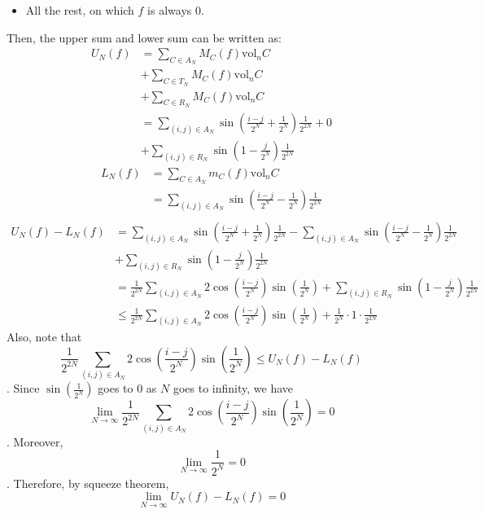 \documentclass{homework}
\begin{document}
\begin{problem}{1}
\begin{itemize}
\item All the rest, on which $f$ is always $0$.
\end{itemize}
Then, the upper sum and lower sum can be written as:
\begin{align*}
U_N(f) &= \sum_{C \in A_N} M_C(f) \mathrm{vol}_n C \\
       &+ \sum_{C \in T_N} M_C(f) \mathrm{vol}_n C \\
       &+ \sum_{C \in R_N} M_C(f) \mathrm{vol}_n C \\
       &= \sum_{(i, j) \in A_N}
          \sin(\frac{i - j}{2^N} + \frac{1}{2^N}) \frac{1}{2^{2N}}
        + 0 \\
       &+ \sum_{(i, j) \in R_N}
          \sin(1 - \frac{j}{2^N}) \frac{1}{2^{2N}}
\end{align*}
\begin{align*}
L_N(f) &= \sum_{C \in A_N} m_C(f) \mathrm{vol}_n C \\
       &= \sum_{(i, j) \in A_N}
          \sin(\frac{i - j}{2^N} - \frac{1}{2^N}) \frac{1}{2^{2N}} \\
\end{align*}
\begin{align*}
U_N(f) - L_N(f)
&= \sum_{(i, j)\in A_N}\sin(\frac{i-j}{2^N}+\frac{1}{2^N})\frac{1}{2^{2N}}
 - \sum_{(i, j)\in A_N}\sin(\frac{i-j}{2^N}-\frac{1}{2^N})\frac{1}{2^{2N}} \\
&+ \sum_{(i, j) \in R_N} \sin(1 - \frac{j}{2^N}) \frac{1}{2^{2N}} \\
&= \frac{1}{2^{2N}} \sum_{(i, j)\in A_N}
   2\cos(\frac{i-j}{2^N})\sin(\frac{1}{2^N})
 + \sum_{(i, j) \in R_N} \sin(1 - \frac{j}{2^N}) \frac{1}{2^{2N}} \\
&\leq \frac{1}{2^{2N}} \sum_{(i, j)\in A_N}
      2\cos(\frac{i-j}{2^N})\sin(\frac{1}{2^N})
    + \frac{1}{2^N} \cdot 1 \cdot \frac{1}{2^{2N}}
\end{align*}
Also, note that
$$\frac{1}{2^{2N}} \sum_{(i, j)\in A_N}
  2\cos(\frac{i-j}{2^N})\sin(\frac{1}{2^N})
  \leq U_N(f) - L_N(f)
$$
. Since $\sin(\frac{1}{2^N})$ goes to $0$ as $N$ goes to infinity, we have
$$\lim_{N \to \infty}
  \frac{1}{2^{2N}} \sum_{(i, j)\in A_N}
  2\cos(\frac{i-j}{2^N})\sin(\frac{1}{2^N})
  = 0
$$
. Moreover,
$$\lim_{N \to \infty} \frac{1}{2^N} = 0$$
. Therefore, by squeeze theorem,
$$\lim_{N \to \infty} U_N(f) - L_N(f) = 0$$
\QED
\end{problem}
\end{document}

